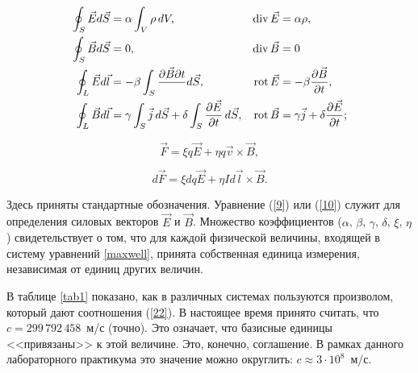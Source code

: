 \begin{gather}
	\eqmark[maxwell]
	\begin{aligned}
		\oint_S \vec{E}d\vec{S} &= \alpha\int_V\rho\,dV, & \Div \vec{E} &= \alpha\rho,\\
		\oint_S\vec{B}d\vec{S} &= 0, & \Div\vec{B} &= 0\\
		\oint_L\vec{E}d\vec{l} &= -\beta\int_S\frac{\partial{\vec{B}} \partial t}\,d\vec{S}, & \Rot\vec{E} &= -\beta\frac{\partial\vec B}{\partial t},\\
		\oint_L\vec{B}d\vec{l} &= \gamma\int_S\vec{j}\,d\vec{S}+\delta\int_S\frac{\partial{\vec{E}}}{\partial t}\,d\vec{S}, & \Rot\vec{B} &= \gamma\vec{j}+\delta\frac{\partial\vec E}{\partial t};
	\end{aligned}
\end{gather}

%

\begin{equation}
	\vec{F}=\xi q\vec{E}+\eta q\vec{v}\times\vec{B},
\end{equation}

\begin{equation}
	d\vec{F}=\xi dq\vec{E}+\eta Id\vec{l}\times\vec{B}.
\end{equation}

Здесь приняты стандартные обозначения. Уравнение (\eqref{9}) или (\eqref{10}) служит для определения силовых векторов $\vec{E}$ и
$\vec{B}$. Множество коэффициентов ($\alpha$, $\beta$, $\gamma$, $\delta$, $\xi$, $\eta$) свидетельствует о том, что для
каждой физической величины, входящей в систему уравнений \eqref{maxwell}, принята собственная единица измерения,
независимая от единиц других величин.


В таблице \ref{tab1} показано, как в различных системах пользуются произволом, который дают соотношения (\eqref{22}). В
настоящее время принято считать, что $c=299\,792\,458$~м/с (точно). Это означает, что базисные единицы <<привязаны>> к
этой величине. Это, конечно, соглашение. В рамках данного лабораторного практикума это значение можно округлить: $c \approx 3 \cdot 10^8$~м/с.

\def\pp{\textbf}

